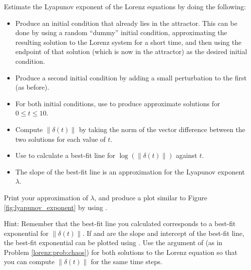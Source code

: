 \begin{problem}
Estimate the Lyapunov exponent of the Lorenz equations by doing the following:
\begin{itemize}
	\item Produce an initial condition that already lies in the attractor. This can be done by using a random ``dummy'' initial condition, approximating the resulting solution to the Lorenz system for a short time, and then using the endpoint of that solution (which is now in the attractor) as the desired initial condition.
	\item Produce a second initial condition by adding a small perturbation to the first (as before).
	\item For both initial conditions, use  to produce approximate solutions for $0 \leq t \leq 10$.
	\item Compute $\|\delta(t)\|$ by taking the norm of the vector difference between the two solutions for each value of $t$.
	\item Use  to calculate a best-fit line for $\log(\|\delta(t)\|)$ against $t$.
	\item The slope of the best-fit line is an approximation for the Lyapunov exponent $\lambda$.
	
\end{itemize}
Print your approximation of $\lambda$, and produce a plot similar to Figure \ref{fig:lyapunov_exponent} by using . 

Hint: Remember that the best-fit line you calculated corresponds to a best-fit exponential for $\|\delta(t)\|$. 
If  and  are the slope and intercept of the best-fit line, the best-fit exponential can be plotted using . 
Use the  argument of  (as in Problem \ref{lorenz:prob:chaos}) for both solutions to the Lorenz equation so that you can compute $\|\delta(t)\|$ for the same time steps.
	

\end{problem}